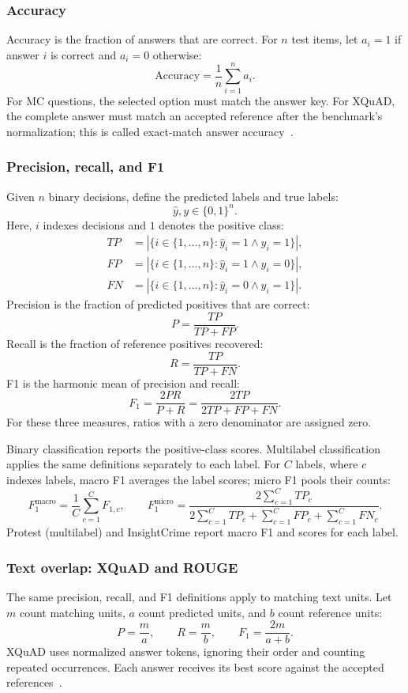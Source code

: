 \documentclass{article}
\begin{document}
\subsubsection{Accuracy}
\label{app:accuracy}
Accuracy is the fraction of answers that are correct. For \(n\) test items, let \(a_i=1\) if answer \(i\) is correct and \(a_i=0\) otherwise:
\[
\mathrm{Accuracy} = \frac{1}{n}\sum_{i=1}^{n} a_i.
\]
For MC questions, the selected option must match the answer key. For XQuAD, the complete answer must match an accepted reference after the benchmark's normalization; this is called exact-match answer accuracy~\cite{XQuad}.

\subsubsection{Precision, recall, and F1}
\label{app:prf}
Given \(n\) binary decisions, define the predicted labels and true labels:
\[
\hat{y},y \in \{0,1\}^n.
\]
Here, \(i\) indexes decisions and \(1\) denotes the positive class:
\[
\begin{aligned}
TP &= \left| \{ i \in \{1,\ldots,n\} : \hat{y}_i = 1 \land y_i = 1 \} \right|, \\
FP &= \left| \{ i \in \{1,\ldots,n\} : \hat{y}_i = 1 \land y_i = 0 \} \right|, \\
FN &= \left| \{ i \in \{1,\ldots,n\} : \hat{y}_i = 0 \land y_i = 1 \} \right|.
\end{aligned}
\]
Precision is the fraction of predicted positives that are correct:
\[
P = \frac{TP}{TP+FP}.
\]
Recall is the fraction of reference positives recovered:
\[
R = \frac{TP}{TP+FN}.
\]
F1 is the harmonic mean of precision and recall:
\[
F_1 = \frac{2PR}{P+R} = \frac{2TP}{2TP+FP+FN}.
\]
For these three measures, ratios with a zero denominator are assigned zero.

Binary classification reports the positive-class scores. Multilabel classification applies the same definitions separately to each label. For \(C\) labels, where \(c\) indexes labels, macro F1 averages the label scores; micro F1 pools their counts:
\[
F_1^{\mathrm{macro}} = \frac{1}{C}\sum_{c=1}^{C}F_{1,c},
\qquad
F_1^{\mathrm{micro}} =
\frac{2\sum_{c=1}^{C}TP_c}
{2\sum_{c=1}^{C}TP_c+\sum_{c=1}^{C}FP_c+\sum_{c=1}^{C}FN_c}.
\]
Protest (multilabel) and InsightCrime report macro F1 and scores for each label.

\subsubsection{Text overlap: XQuAD and ROUGE}
\label{app:text-overlap}
The same precision, recall, and F1 definitions apply to matching text units. Let \(m\) count matching units, \(a\) count predicted units, and \(b\) count reference units:
\[
P = \frac{m}{a}, \qquad R = \frac{m}{b}, \qquad
F_1 = \frac{2m}{a+b}.
\]
XQuAD uses normalized answer tokens, ignoring their order and counting repeated occurrences. Each answer receives its best score against the accepted references~\cite{XQuad}.
\end{document}
